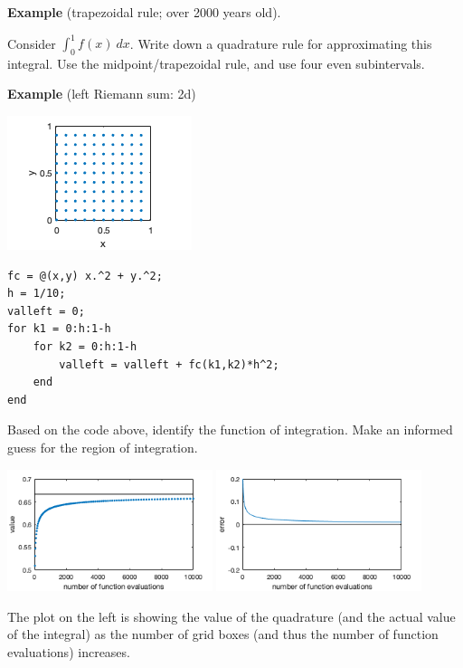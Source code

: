 \documentclass[12pt,letterpaper,noanswers]{exam}
\begin{document}
\noindent\textbf{Example} (trapezoidal rule; over 2000 years old).

Consider $\int_0^1 f(x)\ dx$.  Write down a quadrature rule for approximating this integral.  Use the midpoint/trapezoidal rule, and use four even subintervals.
\vspace{1in}


\noindent\textbf{Example} (left Riemann sum: 2d)

\begin{multicols}{2}

\includegraphics{img/C15domainright.png}

\begin{lstlisting}
fc = @(x,y) x.^2 + y.^2;
h = 1/10;
valleft = 0;
for k1 = 0:h:1-h
    for k2 = 0:h:1-h
        valleft = valleft + fc(k1,k2)*h^2;
    end
end
\end{lstlisting}
\end{multicols}

Based on the code above, identify the function of integration.  Make an informed guess for the region of integration.


\includegraphics[width=0.45\textwidth]{img/C15leftdet.png}
\includegraphics[width=0.45\textwidth]{img/C15leftdeterror.png}

The plot on the left is showing the value of the quadrature (and the actual value of the integral) as the number of grid boxes (and thus the number of function evaluations) increases.
\end{document}
